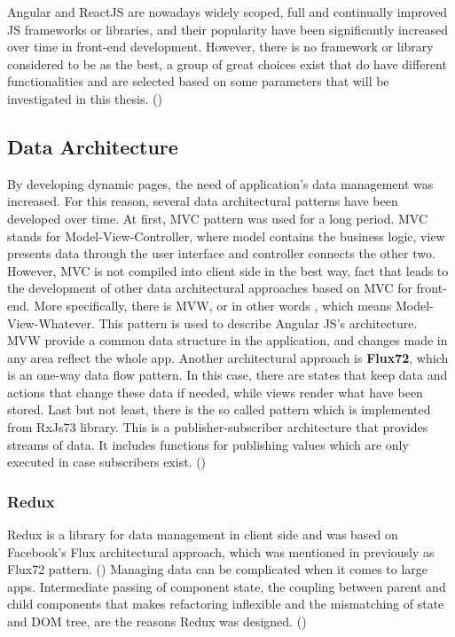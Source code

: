 Angular and ReactJS are nowadays widely scoped, full and continually improved JS frameworks or libraries, and their popularity have been significantly increased over time in front-end development. However, there is no framework or library considered to be as the best, a group of great choices exist that do have different functionalities and are selected based on some parameters that will be investigated in this thesis. (\cite{Reference6}) \par

\subsection{Data Architecture}

By developing dynamic pages, the need of application's data management was increased. For this reason, several data architectural patterns have been developed over time. At first, MVC pattern was used for a long period. MVC stands for Model-View-Controller, where model contains the business logic, view presents data through the user interface and controller connects the other two. However, MVC is not compiled into client side in the best way, fact that leads to the development of other data architectural approaches based on MVC for front-end. More specifically, there is MVW, or in other words , which means Model-View-Whatever. This pattern is used to describe Angular JS's architecture. MVW provide a common data structure in the application, and changes made in any area reflect the whole app. Another architectural approach is \textbf{Flux72}, which is an one-way data flow pattern. In this case, there are states that keep data and actions that change these data if needed, while views render what have been stored. Last but not least, there is the so called  pattern which is implemented from RxJs73 library. This is a publisher-subscriber architecture that provides streams of data. It includes functions for publishing values which are only executed in case subscribers exist. (\cite{murray2018ng}) \par

\subsubsection{Redux}

Redux is a library for data management in client side and was based on Facebook's Flux architectural approach, which was mentioned in previously as Flux72 pattern. (\cite{Reference13}) Managing data can be complicated when it comes to large apps. Intermediate passing of component state, the coupling between parent and child components that makes refactoring inflexible and the mismatching of state and DOM tree, are the reasons Redux was designed. (\citeyearpar{murray2018ng}) \par

